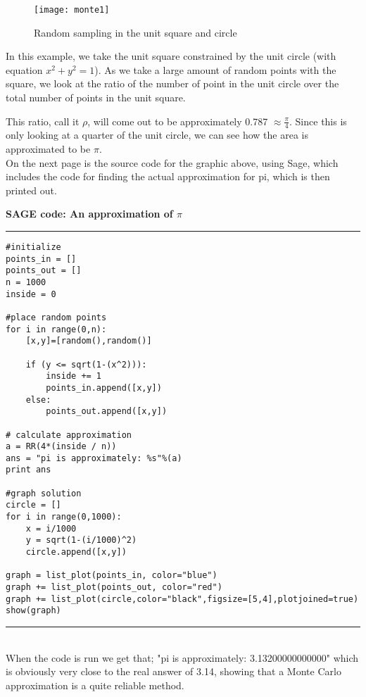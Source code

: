 \documentclass{article}
\begin{document}
\begin{wrapfigure}{r}{0.5\textwidth}
  \vspace{-20pt}
  \begin{center}
    \texttt{[image: monte1]}
  \end{center}
  \caption{Random sampling in the unit square and circle}
  \vspace{-35pt}
  \vspace{30pt}
\end{wrapfigure}

In this example, we take the unit square constrained by the unit circle (with equation $x^2 + y^2 = 1$). As we take a large amount of random points with the square, we look at the ratio of the number of point in the unit circle over the total number of points in the unit square.

This ratio, call it $\rho$, will come out to be approximately 0.787 $\approx \frac{\pi}{4}$. Since this is only looking at a quarter of the unit circle, we can see how the area is approximated to be $\pi$. \\

On the next page is the source code for the graphic above, using Sage, which includes the code for finding the actual approximation for pi, which is then printed out.


\pagebreak
\noindent \textbf{SAGE code: An approximation of $\pi$}

\noindent\rule{8cm}{0.4pt}
\begin{lstlisting}
#initialize
points_in = []
points_out = []
n = 1000
inside = 0

#place random points
for i in range(0,n):
    [x,y]=[random(),random()]

    if (y <= sqrt(1-(x^2))):
        inside += 1
        points_in.append([x,y])
    else:
        points_out.append([x,y])

# calculate approximation
a = RR(4*(inside / n))
ans = "pi is approximately: %s"%(a)
print ans

#graph solution
circle = []
for i in range(0,1000):
    x = i/1000
    y = sqrt(1-(i/1000)^2)
    circle.append([x,y])

graph = list_plot(points_in, color="blue")
graph += list_plot(points_out, color="red")
graph += list_plot(circle,color="black",figsize=[5,4],plotjoined=true)
show(graph)
\end{lstlisting}
\noindent\rule{8cm}{0.4pt} \\

When the code is run we get that; "pi is approximately: 3.13200000000000" which is obviously very close to the real answer of 3.14, showing that a Monte Carlo approximation is a quite reliable method.
\end{document}
